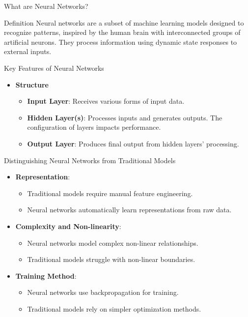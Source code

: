 \documentclass[aspectratio=169]{beamer}
\begin{document}
\begin{frame}{What are Neural Networks?}
    \begin{block}{Definition}
        Neural networks are a subset of machine learning models designed to recognize patterns, inspired by the human brain with interconnected groups of artificial neurons. They process information using dynamic state responses to external inputs.
    \end{block}
\end{frame}

\begin{frame}{Key Features of Neural Networks}
    \begin{itemize}
        \item \textbf{Structure}
        \begin{itemize}
            \item \textbf{Input Layer}: Receives various forms of input data.
            \item \textbf{Hidden Layer(s)}: Processes inputs and generates outputs. The configuration of layers impacts performance.
            \item \textbf{Output Layer}: Produces final output from hidden layers' processing.
        \end{itemize}
    \end{itemize}
\end{frame}

\begin{frame}{Distinguishing Neural Networks from Traditional Models}
    \begin{itemize}
        \item \textbf{Representation}:
        \begin{itemize}
            \item Traditional models require manual feature engineering.
            \item Neural networks automatically learn representations from raw data.
        \end{itemize}
        
        \item \textbf{Complexity and Non-linearity}:
        \begin{itemize}
            \item Neural networks model complex non-linear relationships.
            \item Traditional models struggle with non-linear boundaries.
        \end{itemize}
        
        \item \textbf{Training Method}:
        \begin{itemize}
            \item Neural networks use backpropagation for training.
            \item Traditional models rely on simpler optimization methods.
        \end{itemize}
    \end{itemize}
\end{frame}
\end{document}
